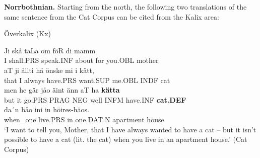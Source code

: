 
\textbf{Norrbothnian.} Starting from the north, the following two translations of the same sentence from the Cat Corpus can be cited from the Kalix area:


\item 


\item 

Överkalix (Kx)



 \ea\label{}
\gll Ji  skå  taLa  om  föR  di  mamm\\


I  shall.PRS  speak.INF  about  for  you.OBL  mother\\

 \ea\label{}
\gll aT  ji  ållti  hä  önske  mi  i  kätt,\\


that  I  always  have.PRS  want.SUP  me.OBL  INDF  cat\\

 \ea\label{}
\gll men  he  gär  jåo  äint  änn  aT  ha  \textbf{kätta}\\


but  it  go.PRS  PRAG  NEG  well  INFM  have.INF  \textbf{cat.DEF}\\

 \ea\label{}
\gll da´n  båo  ini  in  höires-häos.\\


when\_one  live.PRS  in  one.DAT.N  apartment house\\

\glt ‘I want to tell you, Mother, that I have always wanted to have a cat – but it isn’t possible to have a cat (lit. the cat) when you live in an apartment house.’ (Cat Corpus)

\z

